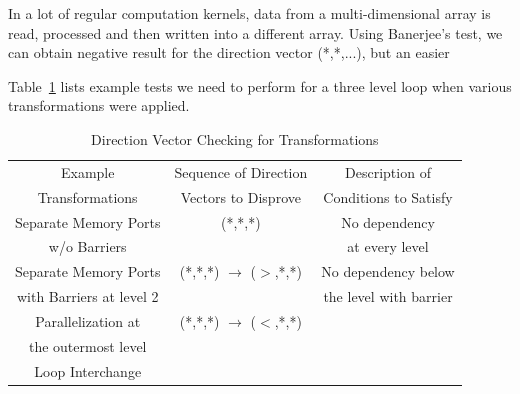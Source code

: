 In a lot of regular computation kernels, data from a multi-dimensional array is read, processed and then written into a different array. Using Banerjee's test, we can obtain negative result for the direction vector (*,*,...), but an easier

Table~\ref{tab:transftest} lists
example tests we need to perform for a three level loop when various transformations were applied.

\begin{table}[htbp]
\caption{Direction Vector Checking for Transformations}
\centering
\begin{tabular}{| c | c | c |  }
  \hline            
 \cline{1-3} 
 Example     & Sequence of Direction  & Description of \\
 Transformations     & Vectors to Disprove & Conditions to Satisfy \\
  \hline    
  Separate Memory Ports & (*,*,*)& No dependency\\
  w/o Barriers & &  at every level\\
  \hline
  Separate Memory Ports & (*,*,*) $\rightarrow$ ($>$,*,*) & No dependency below \\  
   with Barriers at level 2 & & the level with barrier\\
  \hline
  Parallelization at & (*,*,*) $\rightarrow$ ($<$,*,*) &\\
  the outermost level & &\\
  \hline     
  Loop Interchange & &\\
 
\hline                                                                                                           

\end{tabular}
\label{tab:transftest}

\end{table}


